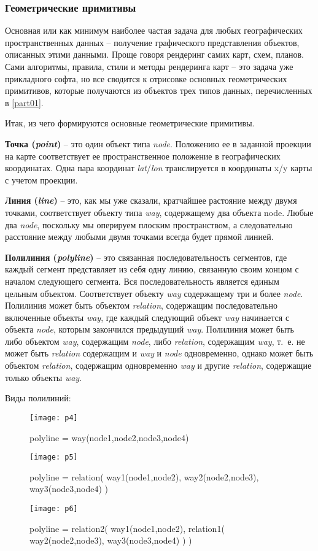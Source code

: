\subsubsection{Геометрические примитивы}
Основная или как минимум наиболее частая задача для любых географических 
пространственных данных -- получение графического представления объектов, 
описанных этими данными. Проще говоря рендеринг самих карт, схем, планов. Сами 
алгоритмы, правила, стили и методы рендеринга карт -- это задача уже 
прикладного софта, но все сводится к отрисовке основных геометрических 
примитивов, которые получаются из объектов трех типов данных, перечисленных в 
\ref{part01}.

Итак, из чего формируются основные геометрические примитивы.

\textbf{Точка (\emph{point})} -- это один объект типа \emph{node}. Положению 
ее в заданной проекции на карте соответствует ее пространственное положение в 
географических координатах. Одна пара координат \emph{lat}/\emph{lon} 
транслируется в координаты x/y карты с учетом проекции.

\textbf{Линия (\emph{line})} -- это, как мы уже сказали, кратчайшее растояние 
между двумя точками, соответствует объекту типа \emph{way}, содержащему два 
объекта node. Любые два \emph{node}, поскольку мы оперируем плоским 
пространством, а следовательно расстояние между любыми двумя точками всегда 
будет прямой линией.

\textbf{Полилиния (\emph{polyline})} -- это связанная последовательность 
сегментов, где каждый сегмент представляет из себя одну линию, связанную своим 
концом с началом следующего сегмента. Вся последовательность является единым 
цельным объектом. Соответствует объекту \emph{way} содержащему три и более 
\emph{node}. Полилиния может быть объектом \emph{relation}, содержащим 
последовательно включенные объекты \emph{way}, где каждый следующий объект 
\emph{way} начинается с объекта \emph{node}, которым закончился предыдущий 
\emph{way}. Полилиния может быть либо объектом \emph{way}, содержащим 
\emph{node}, либо \emph{relation}, содержащим \emph{way}, т.~е. не может быть 
\emph{relation} содержащим и \emph{way} и \emph{node} одновременно, однако 
может быть объектом \emph{relation}, содержащим одновременно \emph{way} и 
другие \emph{relation}, содержащие только объекты \emph{way}.

Виды полилиний:

\begin{figure}[ht!]
    \center
    \texttt{[image: p4]}
    \caption{polyline = way(node1,node2,node3,node4)}
    \texttt{[image: p5]}
    \caption{polyline = relation( way1(node1,node2), 
        way2(node2,node3), way3(node3,node4) )}
    \texttt{[image: p6]}
    \caption{polyline = relation2( way1(node1,node2), 
        relation1( way2(node2,node3), way3(node3,node4) ) )}
\end{figure}


